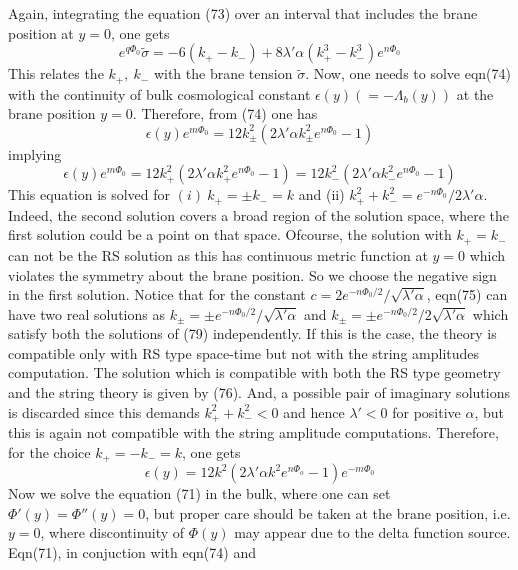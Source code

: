 \documentclass[a4paper,12pt]{article}
\begin{document}
Again, integrating the equation (73) over 
an interval that includes the brane position at $y=0$, one gets
\begin{equation}
e^{q\Phi_0}\tilde{\sigma}
=-6(k_+-k_-)+8\lambda'\alpha (k_+^3-k_-^3) e^{n\Phi_0}
\end{equation}
This relates the $k_+,~ k_-$ with the brane tension $\tilde{\sigma}$. 
Now, one needs to solve eqn(74) with the continuity of 
bulk cosmological constant $\epsilon(y)(=-\Lambda_b(y))$ at the brane 
position $y=0$. Therefore, from (74) one has
\begin{equation}
\epsilon(y)e^{m\Phi_0}=12k_{\pm}^2(2\lambda'\alpha k_{\pm}^2 e^{n\Phi_0}-1)
\end{equation}
implying
\begin{equation}
\epsilon(y) e^{m\Phi_0}=12 k_+^2(2\lambda'\alpha k_+^2 e^{n\Phi_0}-1)
=12 k_-^2(2\lambda'\alpha k_-^2 e^{n\Phi_0}-1)
\end{equation}
This equation is solved for $(i)~ k_+=\pm k_-=k$ and  
(ii) $k_+^2+k_-^2=e^{-n\Phi_0}/{2\lambda'\alpha}$. Indeed, the second 
solution covers a broad region of the solution space, 
where the first solution could be a point on that space. 
Ofcourse, the solution with $k_+=k_-$ can not be the RS solution as this 
has continuous metric function at $y=0$ which violates the symmetry about 
the brane position. So we choose the negative sign in the first solution. 
Notice that for the constant $c=2 e^{-n\Phi_0/2}/\sqrt{\lambda'\alpha}$, 
eqn(75) can have two real solutions as $k_{\pm}=\pm e^{-n\Phi_0/2}/
{\sqrt{\lambda'\alpha}}$ and $k_{\pm}=\pm e^{-n\Phi_0/2}/
{2\sqrt{\lambda'\alpha}}$ which satisfy both the solutions of (79) 
independently. If this is the case, the theory is compatible only 
with RS type space-time but not with the string amplitudes computation. 
 The solution which is compatible with both the RS type geometry and the 
string theory is given by (76). And, a  possible pair of imaginary solutions 
is discarded since this demands $k_+^2+k_-^2<0$ and hence $\lambda'<0$ for 
positive $\alpha$, but this is again not compatible with the string amplitude 
computations. Therefore, for the choice $k_+=-k_-=k$, one gets
\begin{equation}
\epsilon(y)=12k^2(2\lambda'\alpha k^2 e^{n\Phi_o}-1) e^{-m\Phi_0}
\end{equation}
   Now we solve the equation (71) in the bulk, where one can set 
$\Phi'(y)=\Phi''(y)=0$, but proper care should be taken at the brane 
position, i.e. $y=0$, where discontinuity of $\Phi(y)$ may appear due to 
the delta function source. Eqn(71), in conjuction with eqn(74) and 
\end{document}

